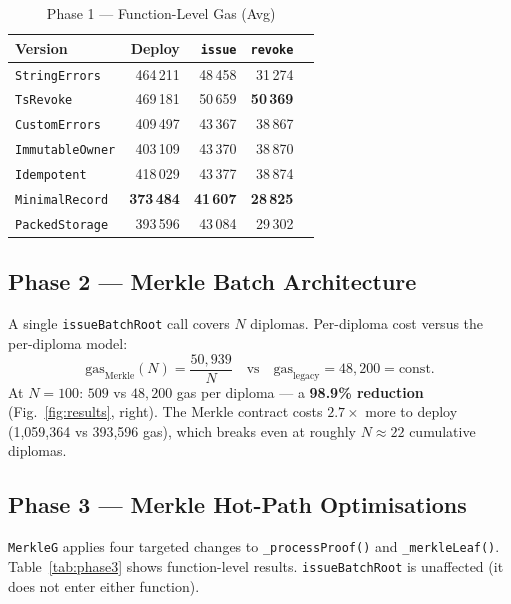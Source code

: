 \documentclass[conference]{IEEEtran}
\begin{document}
\begin{table}[t]
\centering
\caption{Phase 1 — Function-Level Gas (Avg)}
\label{tab:phase1}
\setlength{\tabcolsep}{4pt}
\begin{tabular}{lrrrr}
\toprule
Version & Deploy & \texttt{issue} & \texttt{revoke} \\
\midrule
\texttt{StringErrors}   & 464\,211 & 48\,458 & 31\,274 \\
\texttt{TsRevoke}       & 469\,181 & 50\,659 & \textbf{50\,369} \\
\texttt{CustomErrors}   & 409\,497 & 43\,367 & 38\,867 \\
\texttt{ImmutableOwner} & 403\,109 & 43\,370 & 38\,870 \\
\texttt{Idempotent}     & 418\,029 & 43\,377 & 38\,874 \\
\texttt{MinimalRecord}  & \textbf{373\,484} & \textbf{41\,607} & \textbf{28\,825} \\
\texttt{PackedStorage}  & 393\,596 & 43\,084 & 29\,302 \\
\bottomrule
\end{tabular}
\end{table}

\subsection{Phase 2 — Merkle Batch Architecture}
\label{sec:phase2}

A single \texttt{issueBatchRoot} call covers $N$ diplomas.
Per-diploma cost versus the per-diploma model:
\begin{equation}
\mathrm{gas}_\mathrm{Merkle}(N) = \frac{50{,}939}{N}
\quad \text{vs} \quad
\mathrm{gas}_\mathrm{legacy} = 48{,}200 = \text{const.}
\label{eq:amort}
\end{equation}
At $N = 100$: $509$ vs $48{,}200$ gas per diploma — a
\textbf{98.9\% reduction} (Fig.~\ref{fig:results}, right).
The Merkle contract costs $2.7\times$ more to deploy
(1,059,364 vs 393,596 gas), which breaks even at roughly $N \approx 22$
cumulative diplomas.

\subsection{Phase 3 — Merkle Hot-Path Optimisations}
\label{sec:phase3}

\texttt{MerkleG} applies four targeted changes to
\texttt{\_processProof()} and \texttt{\_merkleLeaf()}.
Table~\ref{tab:phase3} shows function-level results.
\texttt{issueBatchRoot} is unaffected (it does not enter either function).
\end{document}
